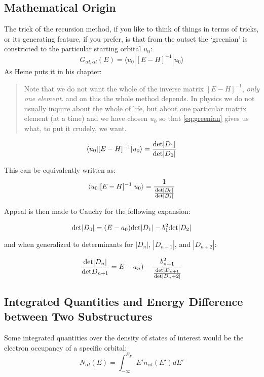 \documentclass{article}
\def\ket{\rangle}
\def\bra{\langle}
\begin{document}
\subsection{Mathematical Origin}
The trick of the recursion method, if you like to think of things in terms of tricks, 
or its generating feature, if you prefer, is that from the outset the `greenian' is constricted
to the particular starting orbital $u_{0}$: 
%
\begin{equation}
G_{\alpha l, \alpha l}(E) = \bra u_{0}|[E-H]^{-1}|u_{0}\ket 
\end{equation}
%
As Heine puts it in his chapter:
%
\begin{quote}
Note that we do not want the whole of the inverse matrix $[E-H]^{-1}$, 
\emph{only one element}. and on this the whole method depends. In physics we do not
usually inquire about the whole of life, but about one particular matrix element (at a time) and we have chosen
$u_{0}$ so that \ref{eq:greenian} gives us what, to put it crudely, we want.
\end{quote}

%
\begin{equation}
\bra u_{0}|[E-H]^{-1}|u_{0}\ket = \frac{{\rm det}|D_{1}|}{{\rm det}|D_{0}|}
\end{equation}
%

This can be equivalently written as:
\begin{equation}
\bra u_{0}|[E-H]^{-1}|u_{0}\ket = \frac{1}{\frac{{\rm det}|D_{0}|}{{\rm det}|D_{1}|}}
\end{equation}

Appeal is then made to Cauchy for the following expansion:

\begin{equation}
{\rm det}|D_{0}| = (E-a_{0}){\rm det}|D_{1}| - b^{2}_{1}{\rm det}|D_{2}|
\end{equation}

and when generalized to determinants for $|D_{n}|$, $|D_{n+1}|$, and $|D_{n+2}|$:

\begin{equation}
\frac{{\rm det}|D_{n}|}{{\rm det} D_{n+1}} = E-a_{n}) - \frac{b^{2}_{n+1}}{\frac{{\rm det}|D_{n+1}}{{\rm det}|D_n+2|}}
\end{equation}

\subsection{Integrated Quantities and Energy Difference between Two Substructures}
Some integrated quantities over the density of states of interest would be
the electron occupancy of a specific orbital:
%
\begin{equation}
N_{\alpha l}(E) = \int_{-\infty}^{E_{F}}E' n_{\alpha l}(E') dE'
\end{equation}
\end{document}
